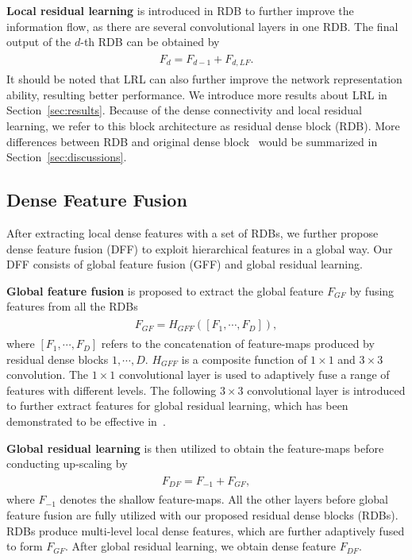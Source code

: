\documentclass[10pt,twocolumn,letterpaper]{article}
\begin{document}
\textbf{Local residual learning} is introduced in RDB to further improve the information flow, as there are several convolutional layers in one RDB. The final output of the $d$-th RDB can be obtained by
\begin{align}
\begin{split}
\label{eq:F_d_RDB}
F_{d}=F_{d-1}+F_{d,LF}.
\end{split}
\end{align}
It should be noted that LRL can also further improve the network representation ability, resulting better performance. We introduce more results about LRL in Section~\ref{sec:results}. Because of the dense connectivity and local residual learning, we refer to this block architecture as residual dense block (RDB). More differences between RDB and original dense block~\cite{huang2017densely} would be summarized in Section~\ref{sec:discussions}.

\subsection{Dense Feature Fusion}
\label{subsec:DFF}
After extracting local dense features with a set of RDBs, we further propose dense feature fusion (DFF) to exploit hierarchical features in a global way. Our DFF consists of global feature fusion (GFF) and global residual learning. 

\textbf{Global feature fusion} is proposed to extract the global feature $F_{GF}$ by fusing features from all the RDBs
\begin{align}
\begin{split}
\label{eq:GFF}
F_{GF}=H_{GFF}\left ( \left [ F_{1},\cdots ,F_{D} \right ] \right ),
\end{split}
\end{align}
where $\left [ F_{1},\cdots ,F_{D} \right ]$ refers to the concatenation of feature-maps produced by residual dense blocks $1,\cdots ,D$. $H_{GFF}$ is a composite function of $1\times 1$ and $3\times 3$ convolution. The $1\times 1$ convolutional layer is used to adaptively fuse a range of features with different levels. The following $3\times 3$ convolutional layer is introduced to further extract features for global residual learning, which has been demonstrated to be effective in~\cite{ledig2017photo}.

\textbf{Global residual learning} is then utilized to obtain the feature-maps before conducting up-scaling by 
\begin{align}
\begin{split}
\label{eq:DFF_GF}
F_{DF}=F_{-1}+F_{GF},
\end{split}
\end{align}
where $F_{-1}$ denotes the shallow feature-maps. All the other layers before global feature fusion are fully utilized with our proposed residual dense blocks (RDBs). RDBs produce multi-level local dense features, which are further adaptively fused to form $F_{GF}$. After global residual learning, we obtain dense feature $F_{DF}$.
\end{document}
